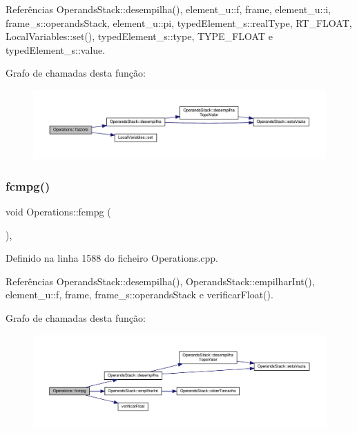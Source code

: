 Referências Operands\+Stack\+::desempilha(), element\+\_\+u\+::f, frame, element\+\_\+u\+::i, frame\+\_\+s\+::operands\+Stack, element\+\_\+u\+::pi, typed\+Element\+\_\+s\+::real\+Type, R\+T\+\_\+\+F\+L\+O\+AT, Local\+Variables\+::set(), typed\+Element\+\_\+s\+::type, T\+Y\+P\+E\+\_\+\+F\+L\+O\+AT e typed\+Element\+\_\+s\+::value.

Grafo de chamadas desta função\+:\nopagebreak
\begin{figure}[H]
\begin{center}
\leavevmode
\includegraphics[width=350pt]{classOperations_aa8a2c3048379b9d5cdc2b4611ef86190_cgraph}
\end{center}
\end{figure}
\mbox{\label{classOperations_a7825305c331404b97ef209a6e6d988ab}} 
\subsubsection{\texorpdfstring{fcmpg()}{fcmpg()}}
{\footnotesize\ttfamily void Operations\+::fcmpg (\begin{DoxyParamCaption}{ }\end{DoxyParamCaption})\hspace{0.3cm}{\ttfamily [static]}, {\ttfamily [private]}}



Definido na linha 1588 do ficheiro Operations.\+cpp.



Referências Operands\+Stack\+::desempilha(), Operands\+Stack\+::empilhar\+Int(), element\+\_\+u\+::f, frame, frame\+\_\+s\+::operands\+Stack e verificar\+Float().

Grafo de chamadas desta função\+:\nopagebreak
\begin{figure}[H]
\begin{center}
\leavevmode
\includegraphics[width=350pt]{classOperations_a7825305c331404b97ef209a6e6d988ab_cgraph}
\end{center}
\end{figure}
\mbox{\label{classOperations_aa4a8e2be93a5cc69e40f483958014e39}} 
